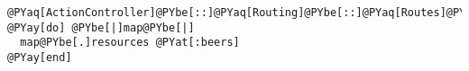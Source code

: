 \begin{Verbatim}[commandchars=@\[\]]
@PYaq[ActionController]@PYbe[::]@PYaq[Routing]@PYbe[::]@PYaq[Routes]@PYbe[.]draw @PYay[do] @PYbe[|]map@PYbe[|]
  map@PYbe[.]resources @PYat[:beers]
@PYay[end]
\end{Verbatim}
